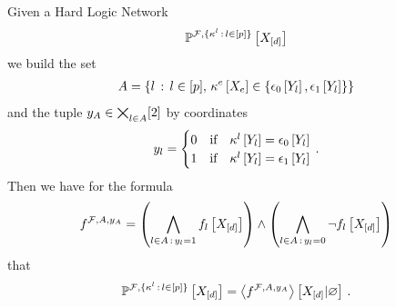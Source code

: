 \begin{theorem}
    Given a Hard Logic Network
    \begin{align*}
        \mathbb{P}^{\mathcal{F},\{\kappa^{l}\,:\,l\in[p]\}}\left[X_{[d]}\right]
    \end{align*}
    we build the set
    \begin{align*}
        A = \{l\,:\,l\in[p],\,\kappa^{e}\left[X_{e}\right]\in\{\epsilon_0\left[Y_{l}\right],\epsilon_1\left[Y_{l}\right]\}\}
    \end{align*}
    and the tuple $y_{A}\in\bigtimes_{l\in A}[2]$ by coordinates
    \begin{align*}
        y_{l}
        = \begin{cases}
              0 & \text{if} \quad \kappa^{l}\left[Y_{l}\right] = \epsilon_0\left[Y_{l}\right] \\
              1 & \text{if} \quad \kappa^{l}\left[Y_{l}\right] = \epsilon_1\left[Y_{l}\right] \\
        \end{cases} \, .
    \end{align*}
    Then we have for the formula
    \begin{align*}
        f^{\mathcal{F},A,y_{A}} =
        \left(\bigwedge_{l\in A\,:\,y_{l}=1} f_{l}\left[X_{[d]}\right]\right)
        \land
        \left(\bigwedge_{l\in A\,:\,y_{l}=0} \lnot f_{l}\left[X_{[d]}\right]\right)
    \end{align*}
    that
    \begin{align*}
        \mathbb{P}^{\mathcal{F},\{\kappa^{l}\,:\,l\in[p]\}}\left[X_{[d]}\right]
        = \left\langle f^{\mathcal{F},A,y_{A}}\right\rangle \left[ X_{[d]} | \varnothing \right] \, .
    \end{align*}
%
%
\end{theorem}
